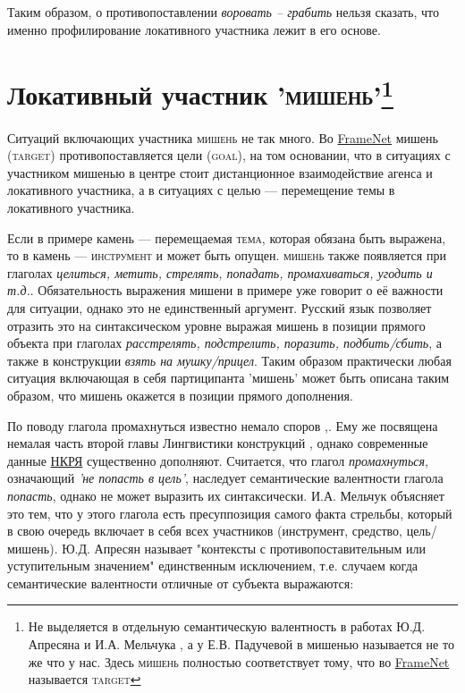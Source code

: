\par Таким образом, о противопоставлении \textit{воровать -- грабить} нельзя сказать, что именно профилирование локативного участника лежит в его основе.

\section[Локативный участник '\textsc{мишень}']{Локативный участник '\textsc{мишень}'\footnote{Не выделяется в отдельную семантическую валентность в работах Ю.Д. Апресяна и И.А. Мельчука \citep{апресян1995избранные2, mel2004actants},  а у Е.В. Падучевой в \citep{падучева2004динамические} мишенью называется не то же что у нас. Здесь \textsc{мишень} полностью соответствует тому, что во \hyperlink{fn}{FrameNet} называется \textsc{target}}}

Ситуаций включающих участника \textsc{мишень} не так много. Во \hyperlink{fn}{FrameNet} мишень (\textsc{target}) противопоставляется цели (\textsc{goal}), на том основании, что в ситуациях с участником мишенью в центре стоит дистанционное взаимодействие агенса и локативного участника, а в ситуациях с целью --- перемещение темы в локативного участника.


Если в примере  камень --- перемещаемая \textsc{тема}, которая обязана быть выражена, то в  камень --- \textsc{инструмент} и может быть опущен. \textsc{мишень} также появляется при глаголах \textit{целиться, метить, стрелять, попадать, промахиваться, угодить и т.д.}. Обязательность выражения мишени в примере  уже говорит о её важности для ситуации, однако это не единственный аргумент. Русский язык позволяет отразить это на синтаксическом уровне выражая мишень в позиции прямого объекта при глаголах \textit{расстрелять, подстрелить, поразить, подбить/сбить}, а также в конструкции \textit{взять на мушку/прицел}. Таким образом практически любая ситуация включающая в себя партиципанта 'мишень' может быть описана таким образом, что мишень окажется в позиции прямого дополнения.

По поводу глагола промахнуться известно немало споров \citep[148]{апресян1995избранные},\citep[135]{мельчук1974опыт}. Ему же посвящена немалая часть второй главы Лингвистики конструкций \citep[315-317]{рахилина2010лингвистика}, однако современные данные \hyperlink{rusc}{НКРЯ} существенно дополняют. Считается, что глагол \textit{промахнуться}, означающий \textit{'не попасть в цель'}, наследует семантические валентности глагола \textit{попасть}, однако не может выразить их синтаксически. И.А. Мельчук \citep{mel2004actants} объясняет это тем, что у этого глагола есть пресуппозиция самого факта стрельбы, который в свою очередь включает в себя всех участников (инструмент, средство, цель/мишень). Ю.Д. Апресян называет "контексты с противопоставительным или уступительным значением" единственным исключением, т.е. случаем когда семантические валентности отличные от субъекта выражаются:

